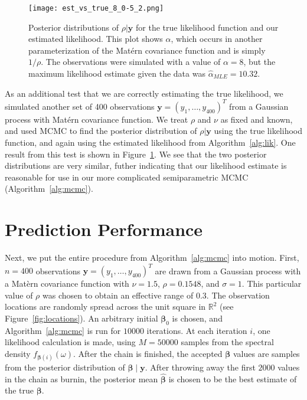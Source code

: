 \begin{figure}[htbp]
	\centering
	\texttt{[image: est\_vs\_true\_8\_0-5\_2.png]}
	\caption{Posterior distributions of $\rho|\bm{y}$ for the true likelihood function and our estimated likelihood. This plot shows $\alpha$, which occurs in another parameterization of the Mat\'ern covariance function and is simply $1/\rho$. The observations were simulated with a value of $\alpha = 8$, but the maximum likelihood estimate given the data was $\hat{\alpha}_{MLE} = 10.32$.}
	\label{fig:compare-one}
\end{figure}

As an additional test that we are correctly estimating the true likelihood, we simulated another set of 400 observations $\bm{y} = (y_1, \dots, y_{400})^T$ from a Gaussian process with Mat\'ern covariance function. We treat $\rho$ and $\nu$ as fixed and known, and used MCMC to find the posterior distribution of $\rho|\bm{y}$ using the true likelihood function, and again using the estimated likelihood from Algorithm~\ref{alg:lik}. One result from this test is shown in Figure~\ref{fig:compare-one}. We see that the two posterior distributions are very similar, futher indicating that our likelihood estimate is reasonable for use in our more complicated semiparametric MCMC (Algorithm~\ref{alg:mcmc}).

\section{Prediction Performance} %
\label{sec:prediction_performance}

Next, we put the entire procedure from Algorithm~\ref{alg:mcmc} into motion. First, $n = 400$ observations $\bm{y} = (y_1, \dots, y_{400})^T$ are drawn from a Gaussian process with a Mat\`{e}rn covariance function with $\nu = 1.5$, $\rho = 0.1548$, and $\sigma = 1$. This particular value of $\rho$ was chosen to obtain an effective range of 0.3. The observation locations are randomly spread across the unit square in $\mathbb{R}^2$ (see Figure~\ref{fig:locations}). An arbitrary initial $\bm{\beta}_0$ is chosen, and Algorithm~\ref{alg:mcmc} is run for $10000$ iterations. At each iteration $i$, one likelihood calculation is made, using $M = 50000$ samples from the spectral density $f_{\bm{\beta}(i)}(\omega)$. After the chain is finished, the accepted $\bm{\beta}$ values are samples from the posterior distribution of $\bm{\beta} \;|\; \bm{y}$. After throwing away the first $2000$ values in the chain as burnin, the posterior mean $\widehat{\bm{\beta}}$ is chosen to be the best estimate of the true $\bm{\beta}$.

